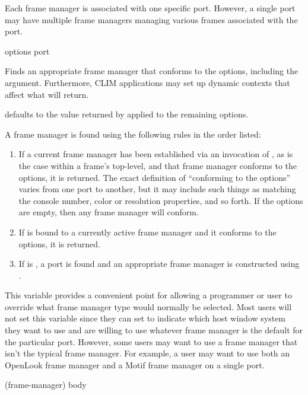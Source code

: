 {Each frame manager is associated with one specific port.  However, a single port
may have multiple frame managers managing various frames associated with the
port.


 {\rest options \key port \allow}

Finds an appropriate frame manager that conforms to the options, including the
 argument.  Furthermore, CLIM applications may set up dynamic contexts
that affect what  will return.

 defaults to the value returned by  applied to the remaining options.

A frame manager is found using the following rules in the order listed:

\begin{enumerate}
\item If a current frame manager has been established via an invocation of
, as is the case within a frame's top-level, and that
frame manager conforms to the options, it is returned.  The exact definition of
``conforming to the options'' varies from one port to another, but it may
include such things as matching the console number, color or resolution
properties, and so forth.  If the options are empty, then any frame manager will
conform.

\item If  is bound to a currently active frame
manager and it conforms to the options, it is returned.

\item If  is , a port is found and an appropriate
frame manager is constructed using .
\end{enumerate}



This variable provides a convenient point for allowing a programmer or user to
override what frame manager type would normally be selected.  Most users will
not set this variable since they can set  to indicate
which host window system they want to use and are willing to use whatever frame
manager is the default for the particular port.  However, some users may want to
use a frame manager that isn't the typical frame manager.  For example, a user
may want to use both an OpenLook frame manager and a Motif frame manager on a
single port.

 {(frame-manager) \body body}

}
